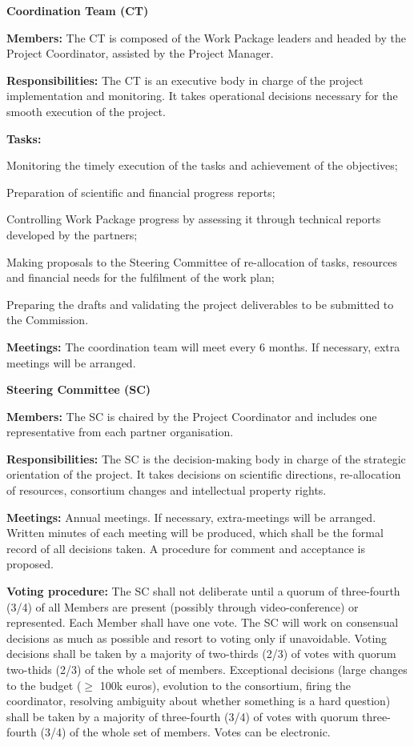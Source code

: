 \begin{description}
\item{\textbf{Coordination Team (CT)}} \nobreak\par
\textbf{Members:} The CT is composed of the Work Package leaders
and headed by the Project Coordinator, assisted by the Project
Manager.

\textbf{Responsibilities:} The CT is an executive body in charge of
the project implementation and monitoring.
It takes operational decisions necessary for the smooth execution of
the project.

\textbf{Tasks:}
\begin{compactenum}
\item Monitoring the timely execution of the tasks and achievement of
  the objectives;
\item Preparation of scientific and financial progress reports;
\item Controlling Work Package progress by assessing it through technical
  reports developed by the partners;
\item Making proposals to the Steering Committee of re-allocation of
  tasks, resources and financial needs for the fulfilment of the work
  plan;
\item Preparing the drafts and validating the project deliverables to
  be submitted to the Commission.
\end{compactenum}

\textbf{Meetings:} The coordination team will meet every 6 months.
If necessary, extra meetings will be arranged.

\item{\textbf{Steering Committee (SC)}}\nobreak\par

\textbf{Members:} The SC is chaired by the Project Coordinator
and includes one representative from each partner organisation.

\textbf{Responsibilities:} The SC is the decision-making body in
charge of the strategic orientation of the project.  It takes decisions on scientific
directions, re-allocation of resources, consortium
changes and intellectual property rights.

\textbf{Meetings:} Annual meetings. If necessary, extra-meetings
will be arranged.  Written minutes of each meeting will be produced,
which shall be the formal record of all decisions taken. A procedure
for comment and acceptance is proposed.

\textbf{Voting procedure:} The SC shall not deliberate until a quorum
of three-fourth (3/4) of all Members are present (possibly through
video-conference) or represented. Each Member shall have one vote. The
SC will work on consensual decisions as much as possible and resort to
voting only if unavoidable. Voting decisions shall be taken by a
majority of two-thirds (2/3) of votes with quorum two-thids (2/3) of
the whole set of members. Exceptional decisions (large changes to the
budget ($\geq$ 100k euros), evolution to the consortium, firing the
coordinator, resolving ambiguity about whether something is a hard
question) shall be taken by a majority of three-fourth (3/4) of votes
with quorum three-fourth (3/4) of the whole set of members. Votes can
be electronic.


\end{description}
